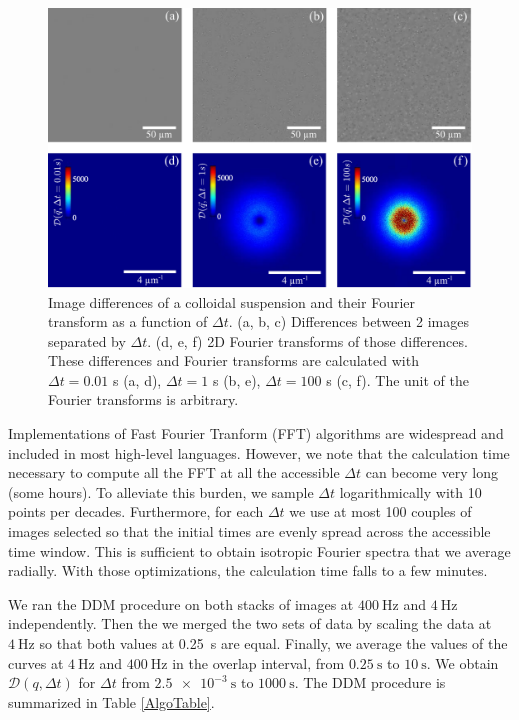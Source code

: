 \documentclass[%
 aip,
 jmp,%
 amsmath,amssymb,
reprint,%
]{revtex4-1}
\begin{document}
\begin{figure}
\includegraphics[width=\linewidth]{Diff_TF.pdf}
\caption{Image differences of a colloidal suspension and their Fourier transform as a function of $\Delta t$. (a, b, c) Differences between 2 images separated by $\Delta t$. (d, e, f) 2D Fourier transforms of those differences. These differences and Fourier transforms are calculated with $\Delta t = 0.01$ s (a, d), $\Delta t = 1$ s (b, e), $\Delta t = 100$ s (c, f). The unit of the Fourier transforms is arbitrary.}
\label{DifferenceAndFFT}
\end{figure}

Implementations of Fast Fourier Tranform (FFT) algorithms are widespread and included in most high-level languages. However, we note that the calculation time necessary to compute all the FFT at all the accessible $\Delta t$ can become very long (some hours). To alleviate this burden, we sample $\Delta t$ logarithmically with 10 points per decades. Furthermore, for each $\Delta t$ we use at most 100 couples of images selected so that the initial times are evenly spread across the accessible time window. This is sufficient to obtain isotropic Fourier spectra that we average radially. With those optimizations, the calculation time falls to a few minutes.

We ran the DDM procedure on both stacks of images at $\SI{400}{\hertz}$ and $\SI{4}{\hertz}$ independently. Then the we merged the two sets of data by scaling the data at $\SI{4}{\hertz}$ so that both values at \SI{0.25}{\second} are equal. Finally, we average the values of the curves at $\SI{4}{\hertz}$ and $\SI{400}{\hertz}$ in the overlap interval, from $\SI{0.25}{\second}$ to $\SI{10}{\second}$. We obtain $\mathcal{D} (q, \Delta t)$ for $\Delta t$ from $\SI{2.5e-3}{\second}$ to $\SI{1000}{\second}$. The DDM procedure is summarized in Table \ref{AlgoTable}.
\end{document}
